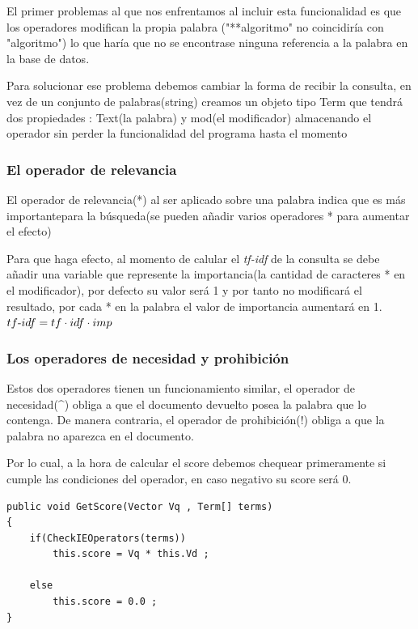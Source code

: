 \documentclass{article}
\begin{document}
El primer problemas al que nos enfrentamos al incluir esta funcionalidad es que los operadores modifican la propia palabra
("**algoritmo" no coincidiría con "algoritmo") lo que haría que no se encontrase ninguna referencia a la palabra en la base de datos.

Para solucionar ese problema debemos cambiar la forma de recibir la consulta, en vez de un conjunto de palabras(string) creamos un objeto
tipo Term que tendrá dos propiedades : Text(la palabra) y mod(el modificador) almacenando el operador sin perder la funcionalidad del programa 
hasta el momento

\subsubsection{El operador de relevancia}
El operador de relevancia(*) al ser aplicado sobre una palabra indica que es más importantepara la búsqueda(se pueden añadir varios operadores * para
aumentar el efecto)

Para que haga efecto, al momento de calular el \textit{tf-idf} de la consulta se debe añadir una variable que represente la importancia(la cantidad de caracteres * en 
el modificador), por defecto su valor será 1 y por tanto no modificará el resultado, por cada * en la palabra el valor de
importancia aumentará en 1. \\[1pt]

$tf\textup{-}idf = tf \cdot idf \cdot imp$ \\[10pt]

\subsubsection{Los operadores de necesidad y prohibición}
Estos dos operadores tienen un funcionamiento similar, el operador de necesidad(\textasciicircum) obliga a que el documento devuelto posea la palabra que lo contenga.
De manera contraria, el operador de prohibición(!) obliga a que la palabra no aparezca en el documento.

Por lo cual, a la hora de calcular el score debemos chequear primeramente si cumple las condiciones del operador, en caso negativo su score será 0.
\\[5pt]

\begin{lstlisting}
public void GetScore(Vector Vq , Term[] terms)
{
    if(CheckIEOperators(terms))
        this.score = Vq * this.Vd ;
        
    else
        this.score = 0.0 ; 
}
\end{lstlisting}
\end{document}

